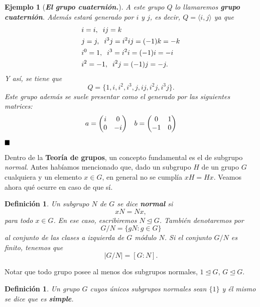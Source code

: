 \documentclass[12pt]{article}
\newtheorem{definition}[theorem]{Definición}
\newtheorem{example}{Ejemplo}[theorem]
\begin{document}
\begin{example}[\textbf{\textit{El grupo cuaternión.}}]
A este grupo $Q$ lo llamaremos \textbf{\textit{grupo cuaternión}}. Además estará generado por $i$ y $j$, es decir, $Q = \langle i,j \rangle$ ya que \begin{equation*}
\begin{aligned}
&i = i, \hspace{0.2cm} ij = k\\
&j = j, \hspace{0.2cm} i^{3}j = i^{2}ij =(-1)k = -k\\
&i^{0} = 1, \hspace{0.2cm} i^{3} = i^{2}i = (-1)i = -i\\
&i^{2} = -1, \hspace{0.2cm} i^{2}j = (-1)j = -j.
\end{aligned}
\end{equation*}
Y así, se tiene que $$Q = \lbrace 1, i, i^{2}, i^{3}, j, ij, i^{2}j, i^{3}j \rbrace.$$
Este grupo además se suele presentar como el generado por las siguientes matrices: $$a = \left(
\begin{matrix}
i & 0 \\
0 & -i
\end{matrix}
\right) \hspace{0.3cm} b = \left(
\begin{matrix}
0 & 1 \\
-1 & 0
\end{matrix}
\right)$$
\end{example}
$\hfill \blacksquare$

Dentro de la \textbf{Teoría de grupos}, un concepto fundamental es el de subgrupo \textit{normal}. Antes habíamos mencionado que, dado un subgrupo $H$ de un grupo $G$ cualquiera y un elemento $x\in G$, en general no se cumplía $xH = Hx$. Veamos ahora qué ocurre en caso de que sí.

\begin{definition} Un subgrupo $N$ de $G$ se dice \textbf{normal} si $$xN = Nx,$$ para todo $x \in G$. En ese caso, escribiremos $N \unlhd G$. También denotaremos por $$G/N = \lbrace gN : g\in G\rbrace$$ al conjunto de las clases a izquierda de $G$ módulo $N$. Si el conjunto $G/N$ es finito, tenemos que $$|G/N| = [G:N].$$
\end{definition}

Notar que todo grupo posee al menos dos subgrupos normales, $1 \unlhd G$, $G \unlhd G$.

\begin{definition} Un grupo $G$ cuyos únicos subgrupos normales sean $\lbrace 1 \rbrace$ y él mismo se dice que es \textbf{simple}.
\end{definition}
\end{document}
